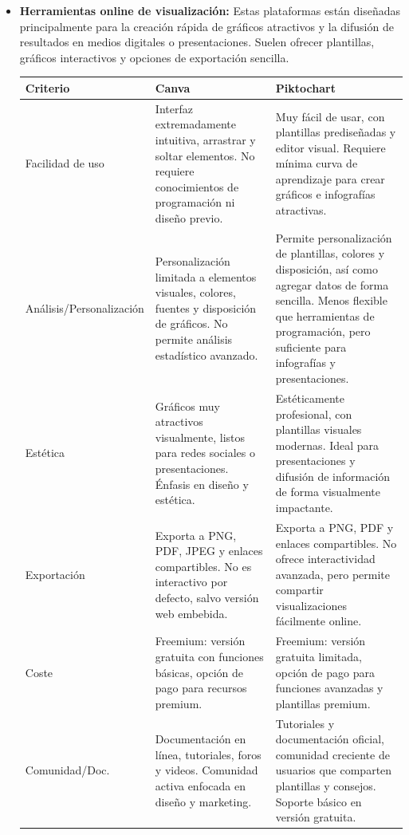 \documentclass{../../miPlantilla}
\begin{document}
\begin{itemize}
    \newpage

    \item \textbf{Herramientas online de visualización:}  
    Estas plataformas están diseñadas principalmente para la creación rápida de gráficos atractivos y la difusión de resultados
    en medios digitales o presentaciones. Suelen ofrecer plantillas, gráficos interactivos y opciones de exportación sencilla.
    
    \begin{table}[H]
        \centering
        \scriptsize %
        \setlength{\tabcolsep}{4pt} %
        \renewcommand{\arraystretch}{1.3} %
        \begin{tabularx}{\textwidth}{
            >{\centering\arraybackslash}X
            >{\centering\arraybackslash}X
            >{\centering\arraybackslash}X
        }
            \toprule
            \rowcolor[HTML]{C0C0C0}
            \textbf{Criterio} & \textbf{Canva} & \textbf{Piktochart} \\ \midrule
            Facilidad de uso & Interfaz extremadamente intuitiva, arrastrar y soltar elementos. No requiere conocimientos de programación ni diseño previo. & Muy fácil de usar, con plantillas prediseñadas y editor visual. Requiere mínima curva de aprendizaje para crear gráficos e infografías atractivas. \\
            \midrule
            Análisis/Personalización & Personalización limitada a elementos visuales, colores, fuentes y disposición de gráficos. No permite análisis estadístico avanzado. & Permite personalización de plantillas, colores y disposición, así como agregar datos de forma sencilla. Menos flexible que herramientas de programación, pero suficiente para infografías y presentaciones. \\
            \midrule
            Estética & Gráficos muy atractivos visualmente, listos para redes sociales o presentaciones. Énfasis en diseño y estética. & Estéticamente profesional, con plantillas visuales modernas. Ideal para presentaciones y difusión de información de forma visualmente impactante. \\
            \midrule
            Exportación & Exporta a PNG, PDF, JPEG y enlaces compartibles. No es interactivo por defecto, salvo versión web embebida. & Exporta a PNG, PDF y enlaces compartibles. No ofrece interactividad avanzada, pero permite compartir visualizaciones fácilmente online. \\
            \midrule
            Coste & Freemium: versión gratuita con funciones básicas, opción de pago para recursos premium. & Freemium: versión gratuita limitada, opción de pago para funciones avanzadas y plantillas premium. \\
            \midrule
            Comunidad/Doc. & Documentación en línea, tutoriales, foros y videos. Comunidad activa enfocada en diseño y marketing. & Tutoriales y documentación oficial, comunidad creciente de usuarios que comparten plantillas y consejos. Soporte básico en versión gratuita. \\
            \bottomrule
        \end{tabularx}
    \end{table}


\end{itemize}
\end{document}

